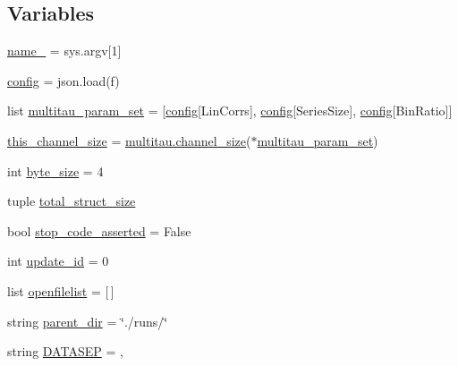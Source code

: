 \subsection*{Variables}
\begin{DoxyCompactItemize}
\item 
\hyperlink{namespacephoton__statistics_a729c361165a662402f88b585477d2ee6}{name\+\_\+} = sys.\+argv\mbox{[}1\mbox{]}
\item 
\hyperlink{namespacephoton__statistics_a4176c548148b1c86da6ddf320ab00e90}{config} = json.\+load(f)
\item 
list \hyperlink{namespacephoton__statistics_a3c57d728c4b1cdcb2b6ca63bc6adfc4d}{multitau\+\_\+param\+\_\+set} = \mbox{[}\hyperlink{namespacephoton__statistics_a4176c548148b1c86da6ddf320ab00e90}{config}\mbox{[}\textquotesingle{}Lin\+Corrs\textquotesingle{}\mbox{]}, \hyperlink{namespacephoton__statistics_a4176c548148b1c86da6ddf320ab00e90}{config}\mbox{[}\textquotesingle{}Series\+Size\textquotesingle{}\mbox{]}, \hyperlink{namespacephoton__statistics_a4176c548148b1c86da6ddf320ab00e90}{config}\mbox{[}\textquotesingle{}Bin\+Ratio\textquotesingle{}\mbox{]}\mbox{]}
\item 
\hyperlink{namespacephoton__statistics_a397f80b778ada9e9d514e3ed06936540}{this\+\_\+channel\+\_\+size} = \hyperlink{namespacemultitau_a1022c52950a892396ac45e7de5379e12}{multitau.\+channel\+\_\+size}($\ast$\hyperlink{namespacephoton__statistics_a3c57d728c4b1cdcb2b6ca63bc6adfc4d}{multitau\+\_\+param\+\_\+set})
\item 
int \hyperlink{namespacephoton__statistics_a12cca295f67eb3583c567d9907a3fe4f}{byte\+\_\+size} = 4
\item 
tuple \hyperlink{namespacephoton__statistics_a5b69b2191de100464a5ebcc9ebe30017}{total\+\_\+struct\+\_\+size}
\item 
bool \hyperlink{namespacephoton__statistics_ae06425daaa0688ab0ff42c7619615e1d}{stop\+\_\+code\+\_\+asserted} = False
\item 
int \hyperlink{namespacephoton__statistics_aa0ea01ea8f5c4844ed6c10dbe51d0497}{update\+\_\+id} = 0
\item 
list \hyperlink{namespacephoton__statistics_ad632a8023bd406f2a2486a1c5d3e7832}{openfilelist} = \mbox{[}$\,$\mbox{]}
\item 
string \hyperlink{namespacephoton__statistics_a255f06b87745f05837e1623b921ae692}{parent\+\_\+dir} = \char`\"{}./runs/\char`\"{}
\item 
string \hyperlink{namespacephoton__statistics_ab381c3496e1a3a8d6dae99e66447c10c}{D\+A\+T\+A\+S\+EP} = \textquotesingle{},\textquotesingle{}

\end{DoxyCompactItemize}
